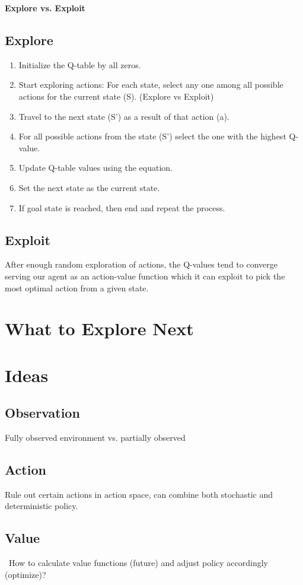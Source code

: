 \documentclass{article}
\begin{document}
\textbf{Explore vs. Exploit}

\subsection{Explore}
  \begin{enumerate}
    \item Initialize the Q-table by all zeros.
    \item Start exploring actions: For each state, select any one among all possible actions for the current state (S). (Explore vs Exploit)
    \item Travel to the next state (S') as a result of that action (a).
    \item For all possible actions from the state (S') select the one with the highest Q-value.
    \item Update Q-table values using the equation.
    \item Set the next state as the current state.
    \item If goal state is reached, then end and repeat the process.
  \end{enumerate}
\subsection{Exploit}
  After enough random exploration of actions, the Q-values tend to converge serving our agent as an action-value function which it can exploit to pick the most optimal action from a given state.
    
    
\section{What to Explore Next}
\section{Ideas}
    \subsection{Observation}
      Fully observed environment vs. partially observed\
    \subsection{Action}
      Rule out certain actions in action space, can combine both stochastic and deterministic policy.
    \subsection{Value}\
      How to calculate value functions (future) and adjust policy accordingly (optimize)? 
\end{document}
